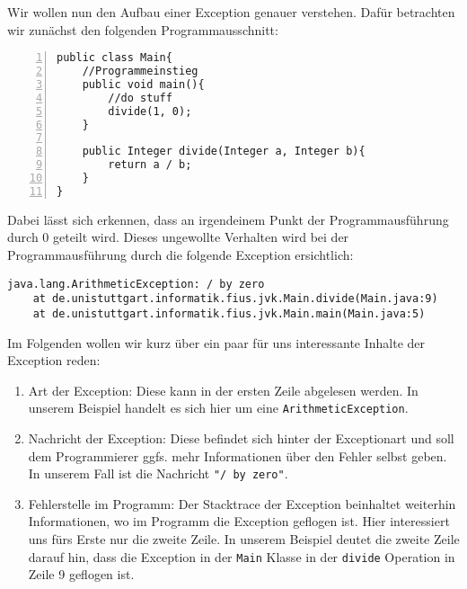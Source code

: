 \begin{Infobox}
    Wir wollen nun den Aufbau einer Exception genauer verstehen. 
    Dafür betrachten wir zunächst den folgenden Programmausschnitt:

    \begin{lstlisting}[numbers=left,xleftmargin=2em,frame=single,framexleftmargin=1.5em]
public class Main{
    //Programmeinstieg
    public void main(){
        //do stuff
        divide(1, 0);
    }
    
    public Integer divide(Integer a, Integer b){
        return a / b;
    }
}
    \end{lstlisting}

    Dabei lässt sich erkennen, dass an irgendeinem Punkt der Programmausführung durch 0 geteilt wird.
    Dieses ungewollte Verhalten wird bei der Programmausführung durch die folgende Exception ersichtlich:

    \begin{lstlisting}[keywords={}, breaklines=true, numbers=none]
java.lang.ArithmeticException: / by zero
    at de.unistuttgart.informatik.fius.jvk.Main.divide(Main.java:9)
    at de.unistuttgart.informatik.fius.jvk.Main.main(Main.java:5)
    \end{lstlisting}    

    Im Folgenden wollen wir kurz über ein paar für uns interessante Inhalte der Exception reden:

    \begin{enumerate}[label=\roman*)]
        \item Art der Exception: Diese kann in der ersten Zeile abgelesen werden. In unserem Beispiel handelt es sich hier um eine \lstinline{ArithmeticException}.
        \item Nachricht der Exception: Diese befindet sich hinter der Exceptionart und soll dem Programmierer ggfs. mehr Informationen über den Fehler selbst geben.
        In unserem Fall ist die Nachricht \lstinline{"/ by zero"}. 
        \item Fehlerstelle im Programm: Der Stacktrace der Exception beinhaltet weiterhin Informationen, wo im Programm die Exception geflogen ist. Hier interessiert uns 
        fürs Erste nur die zweite Zeile. In unserem Beispiel deutet die zweite Zeile darauf hin, dass die Exception in der \lstinline{Main} Klasse in der \lstinline{divide}
        Operation in Zeile 9 geflogen ist.
    \end{enumerate}

\end{Infobox}



